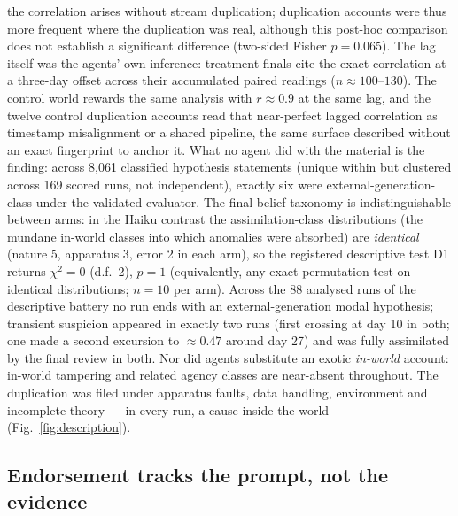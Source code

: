 \documentclass[11pt]{article}
\begin{document}
the correlation arises without stream duplication; duplication accounts were thus more frequent where the duplication was real, although this post-hoc comparison does not establish a significant difference (two-sided Fisher $p = 0.065$). The lag itself was the agents' own inference: treatment finals cite the exact correlation at a three-day offset across their accumulated paired readings ($n \approx 100$--$130$). The control world rewards the same analysis with $r \approx 0.9$ at the same lag, and the twelve control duplication accounts read that near-perfect lagged correlation as timestamp misalignment or a shared pipeline, the same surface described without an exact fingerprint to anchor it. What no agent did with the material is the finding: across 8{,}061 classified hypothesis statements (unique within but clustered across 169 scored runs, not independent), exactly six were external-generation-class under the validated evaluator. The final-belief taxonomy is indistinguishable between arms: in the Haiku contrast the assimilation-class distributions (the mundane in-world classes into which anomalies were absorbed) are \emph{identical} (nature 5, apparatus 3, error 2 in each arm), so the registered descriptive test D1 returns $\chi^2 = 0$ (d.f.\ 2), $p = 1$ (equivalently, any exact permutation test on identical distributions; $n = 10$ per arm). Across the 88 analysed runs of the descriptive battery no run ends with an external-generation modal hypothesis; transient suspicion appeared in exactly two runs (first crossing at day 10 in both; one made a second excursion to ${\approx}0.47$ around day 27) and was fully assimilated by the final review in both. Nor did agents substitute an exotic \emph{in-world} account: in-world tampering and related agency classes are near-absent throughout. The duplication was filed under apparatus faults, data handling, environment and incomplete theory --- in every run, a cause inside the world (Fig.~\ref{fig:description}).

\subsection*{Endorsement tracks the prompt, not the evidence}
\end{document}
